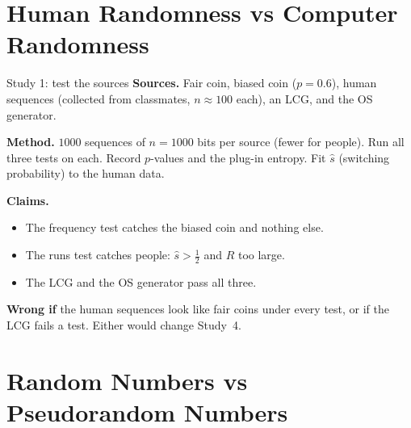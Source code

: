 \documentclass[10pt,aspectratio=169]{beamer}
\begin{document}
\section[Human vs machine]{Human Randomness vs Computer Randomness}

\begin{frame}{Study 1: test the sources}
  \textbf{Sources.} Fair coin, biased coin ($p = 0.6$), human sequences
  (collected from classmates, $n \approx 100$ each), an LCG, and the OS
  generator.
  \medskip

  \textbf{Method.} $1000$ sequences of $n = 1000$ bits per source (fewer
  for people). Run all three tests on each. Record $p$-values and
  the plug-in entropy. Fit $\hat s$ (switching probability) to the human
  data.
  \medskip

  \textbf{Claims.}
  \begin{itemize}
    \item The frequency test catches the biased coin and nothing else.
    \item The runs test catches people: $\hat s > \tfrac12$ and
          $R$ too large.
    \item The LCG and the OS generator pass all three.
  \end{itemize}
  \medskip

  \textbf{Wrong if} the human sequences look like fair coins under every
  test, or if the LCG fails a test. Either would change Study~4.
\end{frame}

\section[PRNG]{Random Numbers vs Pseudorandom Numbers}
\end{document}

